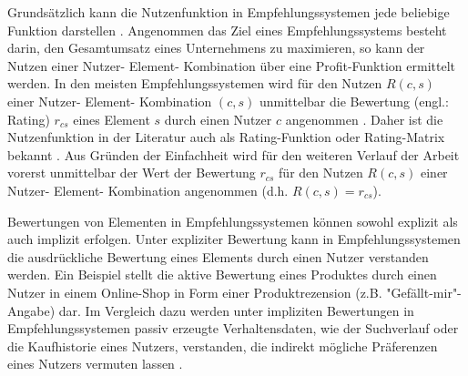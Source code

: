 Grundsätzlich kann die Nutzenfunktion in Empfehlungssystemen jede beliebige Funktion darstellen \cite[S. 735]{adomavicius:inproceedings}.
Angenommen das Ziel eines Empfehlungssystems besteht darin, den Gesamtumsatz eines Unternehmens zu maximieren, so kann der Nutzen einer Nutzer- Element- Kombination über eine Profit-Funktion ermittelt werden.
In den meisten Empfehlungssystemen wird für den Nutzen $R(c,s)$ einer Nutzer- Element- Kombination $(c,s)$ unmittelbar die Bewertung (engl.: Rating) $r_{cs}$ eines Element $s$ durch einen Nutzer $c$ angenommen \cite[S. 735]{adomavicius:inproceedings}\cite[S. 9]{ricci:book}\cite[S. 11]{recommenderSystems:2016}.
Daher ist die Nutzenfunktion in der Literatur auch als Rating-Funktion oder Rating-Matrix bekannt \cite[S. 49]{adomavicius:inproceedings:2}\cite[S. 91]{ekstrand:article}\cite[S. 11]{recommenderSystems:2016}.
Aus Gründen der Einfachheit wird für den weiteren Verlauf der Arbeit vorerst unmittelbar der Wert der Bewertung $r_{cs}$ für den Nutzen $R(c,s)$ einer Nutzer- Element- Kombination angenommen (d.h. $R(c,s) = r_{cs}$).

Bewertungen von Elementen in Empfehlungssystemen können sowohl explizit als auch implizit erfolgen.
Unter expliziter Bewertung kann in Empfehlungssystemen die ausdrückliche Bewertung eines Elements durch einen Nutzer verstanden werden.
Ein Beispiel stellt die aktive Bewertung eines Produktes durch einen Nutzer in einem Online-Shop in Form einer Produktrezension (z.B. "Gefällt-mir"-Angabe) dar.
Im Vergleich dazu werden unter impliziten Bewertungen in Empfehlungssystemen passiv erzeugte Verhaltensdaten, wie der Suchverlauf oder die Kaufhistorie eines Nutzers, verstanden, die indirekt mögliche Präferenzen eines Nutzers vermuten lassen \cite[S. 149]{jadidinejad:inproceedings}\cite[S. 403]{unternährer:article}.

